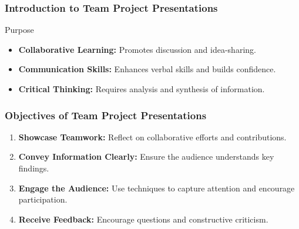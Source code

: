 \documentclass[aspectratio=169]{beamer}
\begin{document}
\frame{\titlepage}

\begin{frame}[fragile]
    \frametitle{Introduction to Team Project Presentations}
    \begin{block}{Purpose}
        \begin{itemize}
            \item \textbf{Collaborative Learning:} Promotes discussion and idea-sharing.
            \item \textbf{Communication Skills:} Enhances verbal skills and builds confidence.
            \item \textbf{Critical Thinking:} Requires analysis and synthesis of information.
        \end{itemize}
    \end{block}
\end{frame}

\begin{frame}[fragile]
    \frametitle{Objectives of Team Project Presentations}
    \begin{enumerate}
        \item \textbf{Showcase Teamwork:} Reflect on collaborative efforts and contributions.
        \item \textbf{Convey Information Clearly:} Ensure the audience understands key findings.
        \item \textbf{Engage the Audience:} Use techniques to capture attention and encourage participation.
        \item \textbf{Receive Feedback:} Encourage questions and constructive criticism.
    \end{enumerate}
\end{frame}
\end{document}
